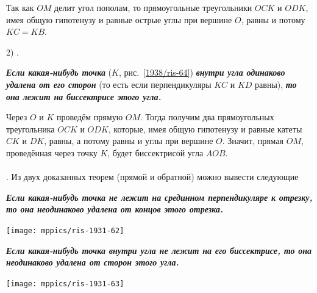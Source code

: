 \documentclass[twoside]{book}
\begin{document}
\begin{paracol}{2}
{\medskip

Так как $OM$ делит угол пополам, то прямоугольные треугольники $OCK$ и $ODK$, имея общую гипотенузу и равные острые углы при вершине $O$, равны и потому $KC=KB$.

2) .

\textbf{\emph{Если какая-нибудь точка}} ($K$, рис.~\ref{1938/ris-64}) \textbf{\emph{внутри угла одинаково удалена от его сторон}} (то есть если перпендикуляры $KC$ и $KD$ равны), \textbf{\emph{то она лежит на биссектрисе этого угла.}}

Через $O$ и $K$ проведём прямую $OM$.
Тогда получим два прямоугольных треугольника $OCK$ и $ODK$, которые, имея общую гипотенузу и равные катеты $CK$ и $DK$, равны, а потому равны и углы при вершине $O$.
Значит, прямая $OM$, проведённая через точку $K$, будет биссектрисой угла $AOB$.



}
\end{paracol}


\paragraph{}\label{1938/59}
.
Из двух доказанных теорем (прямой и обратной) можно вывести следующие 

\medskip

\begin{paracol}{2}

{\sloppy
\textbf{\emph{Если какая-нибудь точка не лежит на срединном перпендикуляре к отрезку, то она неодинаково удалена от концов этого отрезка.}}

\medskip

{\centering
\texttt{[image: mppics/ris-1931-62]}
\label{1931/ris-62}
\addtocounter{figure}{1}
}



}

\switchcolumn

{\sloppy

\textbf{\emph{Если какая-нибудь точка внутри угла не лежит на его биссектрисе, то она неодинаково удалена от сторон этого угла.}}

\medskip

{\centering
\texttt{[image: mppics/ris-1931-63]}
\label{1931/ris-63}
\addtocounter{figure}{1}
}
}

\end{paracol}
\setlength{\columnseprule}{0pt}
\end{document}
